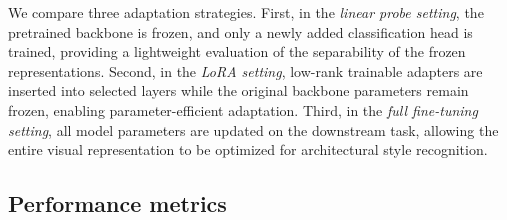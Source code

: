 \documentclass[lineno,pdflatex,sn-mathphys-num]{sn-jnl}%
\theoremstyle{thmstyleone}%
\theoremstyle{thmstyletwo}%
\theoremstyle{thmstylethree}%
\begin{document}
We compare three adaptation strategies. First, in the \textit{linear probe setting}, the pretrained backbone is frozen, and only a newly added classification head is trained, providing a lightweight evaluation of the separability of the frozen representations. Second, in the \textit{LoRA setting}, low-rank trainable adapters are inserted into selected layers while the original backbone parameters remain frozen, enabling parameter-efficient adaptation. Third, in the \textit{full fine-tuning setting}, all model parameters are updated on the downstream task, allowing the entire visual representation to be optimized for architectural style recognition.



\subsection{Performance metrics}
\end{document}
